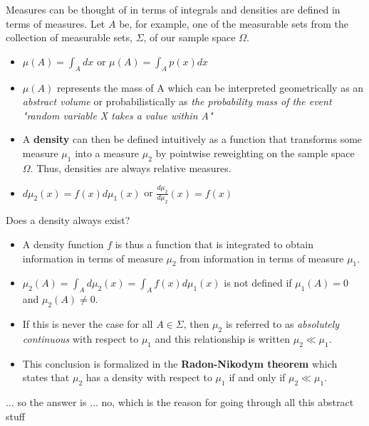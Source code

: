 \begin{frame}
Measures can be thought of in terms of integrals and densities are defined in terms of measures. Let $A$ be, for example, one of the measurable sets from the collection of measurable sets, $\Sigma$, of our sample space $\Omega$.

\begin{itemize}
\item $\mu(A) = \int_A dx$ or $\mu(A) = \int_A p(x)dx$
\item $\mu(A)$ represents the mass of A which can be interpreted geometrically as an \emph{abstract volume} or probabilistically as \emph{the probability mass of the event "random variable X takes a value within A"}
\item A \textbf{density} can then be defined intuitively as a function that transforms some measure $\mu_1$ into a measure $\mu_2$ by pointwise reweighting on the sample space $\Omega$. Thus, densities are always relative measures.
\item $d \mu_2 (x) = f(x) d \mu_1 (x)$ or $\frac{d \mu_2}{d \mu_2} (x) = f(x)$
\end{itemize}

\end{frame}

\begin{frame}
Does a density always exist?

\begin{itemize}
\item A density function $f$ is thus a function that is integrated to obtain information in terms of measure $\mu_2$ from information in terms of measure $\mu_1$. 
\item $\mu_2 (A) = \int_A d \mu_2 (x) = \int_A f(x) d \mu_1 (x)$ is not defined if $\mu_1(A) = 0$ and $\mu_2(A) \neq 0$.
\item If this is never the case for all $A \in \Sigma$, then $\mu_2$ is referred to as \emph{absolutely continuous} with respect to $\mu_1$ and this relationship is written $\mu_2 \ll \mu_1$.
\item This conclusion is formalized in the \textbf{Radon-Nikodym theorem} which states that $\mu_2$ has a density with respect to $\mu_1$ if and only if $\mu_2 \ll \mu_1$.
\end{itemize}
$\ldots$ so the answer is $\ldots$ no, which is the reason for going through all this abstract stuff
\end{frame}